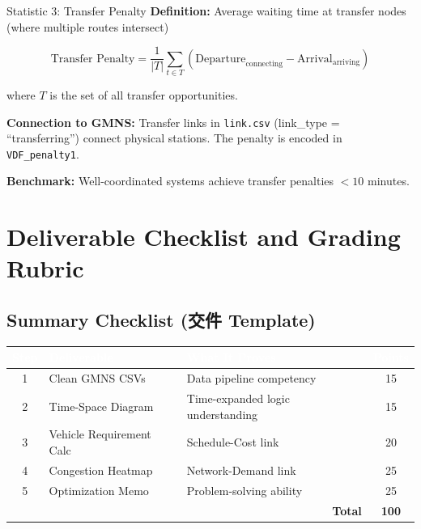 \documentclass[11pt,letterpaper]{article}
\begin{document}
\begin{metricbox}{Statistic 3: Transfer Penalty}
\textbf{Definition:} Average waiting time at transfer nodes (where multiple routes intersect)

\[
\text{Transfer Penalty} = \frac{1}{|T|} \sum_{t \in T} \left( \text{Departure}_{\text{connecting}} - \text{Arrival}_{\text{arriving}} \right)
\]

where $T$ is the set of all transfer opportunities.

\textbf{Connection to GMNS:} Transfer links in \texttt{link.csv} (link\_type = ``transferring'') connect physical stations. The penalty is encoded in \texttt{VDF\_penalty1}.

\textbf{Benchmark:} Well-coordinated systems achieve transfer penalties $< 10$ minutes.
\end{metricbox}

\section{Deliverable Checklist and Grading Rubric}

\subsection{Summary Checklist (交件 Template)}

\begin{center}
\begin{tabular}{|c|l|l|c|}
\hline
\rowcolor{darkblue}\textcolor{white}{\textbf{Step}} & \textcolor{white}{\textbf{Deliverable}} & \textcolor{white}{\textbf{What It Proves}} & \textcolor{white}{\textbf{Points}} \\
\hline
1 & Clean GMNS CSVs & Data pipeline competency & 15 \\
\hline
2 & Time-Space Diagram & Time-expanded logic understanding & 15 \\
\hline
3 & Vehicle Requirement Calc & Schedule-Cost link & 20 \\
\hline
4 & Congestion Heatmap & Network-Demand link & 25 \\
\hline
5 & Optimization Memo & Problem-solving ability & 25 \\
\hline
\multicolumn{3}{|r|}{\textbf{Total}} & \textbf{100} \\
\hline
\end{tabular}
\end{center}
\end{document}
